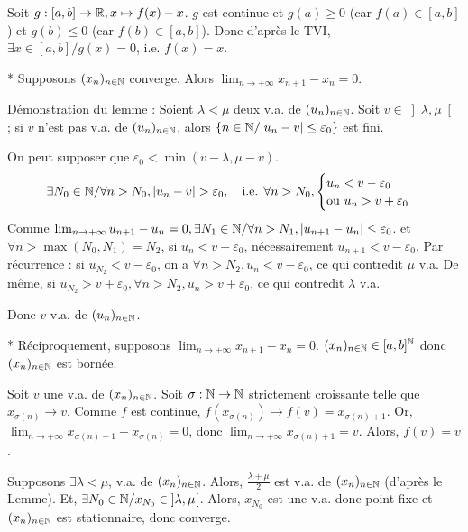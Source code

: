 \begin{solution}
Soit $g : [a,b] \to \mathbb R, x \mapsto f(x) - x$. $g$ est continue et $g(a) \geq 0$ (car $f(a) \in [a,b]$) et $g(b) \leq 0$ (car $f(b) \in [a,b]$).
Donc d'après le TVI, $\exists x \in [a,b] / g(x) = 0$, i.e. $f(x) = x$.

* Supposons $(x_n)_{n \in \mathbb N}$ converge. Alors $\lim_{n \to +\infty} x_{n+1} - x_n = 0$.

\begin{lemma*}
Démonstration du lemme : Soient $\lambda < \mu$ deux v.a. de $(u_n)_{n \in \mathbb N}$.
Soit $v \in \left] \lambda, \mu \right[$ ; si $v$ n'est pas v.a. de $(u_n)_{n \in \mathbb N}$, alors $\{n \in \mathbb N / |u_n - v| \leq \varepsilon_0\}$ est fini.
\end{lemma*}
On peut supposer que $\varepsilon_0 < \min(v - \lambda, \mu - v)$.
\[
\exists N_0 \in \mathbb N / \forall n > N_0, |u_n - v| > \varepsilon_0, \quad \text{i.e. } \forall n > N_0, \begin{cases} u_n < v - \varepsilon_0 \\ \text{ou } u_n > v + \varepsilon_0 \end{cases}
\]
Comme $\lim_{n \to +\infty} u_{n+1} - u_n = 0, \exists N_1 \in \mathbb N / \forall n > N_1, |u_{n+1} - u_n| \leq \varepsilon_0$.
et $\forall n > \max(N_0, N_1) = N_2$, si $u_n < v - \varepsilon_0$, nécessairement $u_{n+1} < v - \varepsilon_0$.
Par récurrence : si $u_{N_2} < v - \varepsilon_0$, on a $\forall n > N_2, u_n < v - \varepsilon_0$, ce qui contredit $\mu$ v.a.
De même, si $u_{N_2} > v + \varepsilon_0, \forall n > N_2, u_n > v + \varepsilon_0$, ce qui contredit $\lambda$ v.a.

Donc $v$ v.a. de $(u_n)_{n \in \mathbb N}$.

* Réciproquement, supposons $\lim_{n \to +\infty} x_{n+1} - x_n = 0$.
$(x_n)_{n \in \mathbb N} \in [a,b]^\mathbb N$ donc $(x_n)_{n \in \mathbb N}$ est bornée.

Soit $v$ une v.a. de $(x_n)_{n \in \mathbb N}$. Soit $\sigma : \mathbb N \to \mathbb N$ strictement croissante telle que $x_{\sigma(n)} \to v$.
Comme $f$ est continue, $f(x_{\sigma(n)}) \to f(v) = x_{\sigma(n)+1}$.
Or, $\lim_{n \to +\infty} x_{\sigma(n)+1} - x_{\sigma(n)} = 0$, donc $\lim_{n \to +\infty} x_{\sigma(n)+1} = v$.
Alors, $f(v) = v$.

Supposons $\exists \lambda < \mu$, v.a. de $(x_n)_{n \in \mathbb N}$. Alors, $\frac{\lambda + \mu}{2}$ est v.a. de $(x_n)_{n \in \mathbb N}$ (d'après le Lemme).
Et, $\exists N_0 \in \mathbb N / x_{N_0} \in \left] \lambda, \mu \right[$.
Alors, $x_{N_0}$ est une v.a. donc point fixe et $(x_n)_{n \in \mathbb N}$ est stationnaire, donc converge.
\end{solution}

